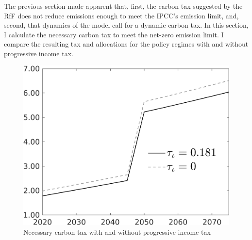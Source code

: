  The previous section made apparent that, first, the carbon tax suggested by the RfF does not reduce emissions enough to meet the IPCC's emission limit, and, second, that dynamics of the model call for a dynamic carbon tax. In this section, I calculate the necessary carbon tax to meet the net-zero emission limit. I compare the resulting tax and allocations for the policy regimes with and without progressive income tax. 
 
 \begin{figure}[h!!]
 	\centering
 	\caption{Necessary carbon tax with and without progressive income tax  }\label{fig:Limit_nsk0_xgr0_know}		
 	\begin{minipage}[]{0.32\textwidth}
 		\includegraphics[width=1\textwidth]{../../codding_model/own_basedOnFried/optimalPol_010922_revision/figures/all_13Sept22/CompTauf_bytaul_Reg0_tauf_spillover0_nsk0_xgr0_knspil0_sep0_LFlimit1_emsbase0_countec0_GovRev0_etaa0.79_lgd1.png}
 	\end{minipage}		\begin{minipage}[]{0.32\textwidth}

\end{minipage}
\end{figure}

